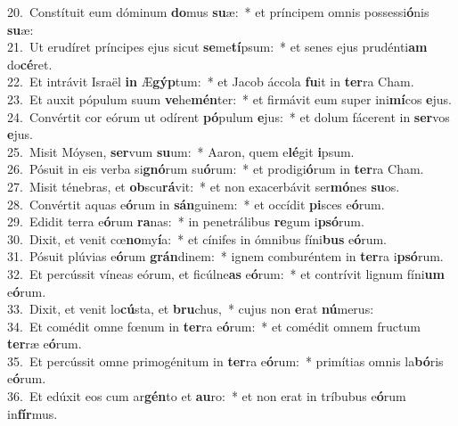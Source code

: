 {20.~}Constítuit eum dóminum \textbf{do}mus \textbf{su}æ:~* et príncipem omnis possessi\textbf{ó}nis \textbf{su}æ:\\
{21.~}Ut erudíret príncipes ejus sicut \textbf{se}me\textbf{tí}psum:~* et senes ejus prudénti\textbf{am} do\textbf{cé}ret.\\
{22.~}Et intrávit Israël \textbf{in} Æ\textbf{gýp}tum:~* et Jacob áccola \textbf{fu}it in \textbf{ter}ra Cham.\\
{23.~}Et auxit pópulum suum \textbf{ve}he\textbf{mén}ter:~* et firmávit eum super ini\textbf{mí}cos \textbf{e}jus.\\
{24.~}Convértit cor eórum ut odírent \textbf{pó}pulum \textbf{e}jus:~* et dolum fácerent in \textbf{ser}vos \textbf{e}jus.\\
{25.~}Misit Móysen, \textbf{ser}vum \textbf{su}um:~* Aaron, quem e\textbf{lé}git \textbf{i}psum.\\
{26.~}Pósuit in eis verba si\textbf{gnó}rum su\textbf{ó}rum:~* et prodigi\textbf{ó}rum in \textbf{ter}ra Cham.\\
{27.~}Misit ténebras, et \textbf{ob}scu\textbf{rá}vit:~* et non exacerbávit ser\textbf{mó}nes \textbf{su}os.\\
{28.~}Convértit aquas e\textbf{ó}rum in \textbf{sán}guinem:~* et occídit \textbf{pi}sces e\textbf{ó}rum.\\
{29.~}Edidit terra e\textbf{ó}rum \textbf{ra}nas:~* in penetrálibus \textbf{re}gum i\textbf{psó}rum.\\
{30.~}Dixit, et venit cœ\textbf{no}my\textbf{í}a:~* et cínifes in ómnibus fíni\textbf{bus} e\textbf{ó}rum.\\
{31.~}Pósuit plúvias e\textbf{ó}rum \textbf{grán}dinem:~* ignem comburéntem in \textbf{ter}ra i\textbf{psó}rum.\\
{32.~}Et percússit víneas eórum, et ficúlne\textbf{as} e\textbf{ó}rum:~* et contrívit lignum fíni\textbf{um} e\textbf{ó}rum.\\
{33.~}Dixit, et venit lo\textbf{cú}sta, et \textbf{bru}chus,~* cujus non \textbf{e}rat \textbf{nú}merus:\\
{34.~}Et comédit omne fœnum in \textbf{ter}ra e\textbf{ó}rum:~* et comédit omnem fructum \textbf{ter}ræ e\textbf{ó}rum.\\
{35.~}Et percússit omne primogénitum in \textbf{ter}ra e\textbf{ó}rum:~* primítias omnis la\textbf{bó}ris e\textbf{ó}rum.\\
{36.~}Et edúxit eos cum ar\textbf{gén}to et \textbf{au}ro:~* et non erat in tríbubus e\textbf{ó}rum in\textbf{fír}mus.\\
